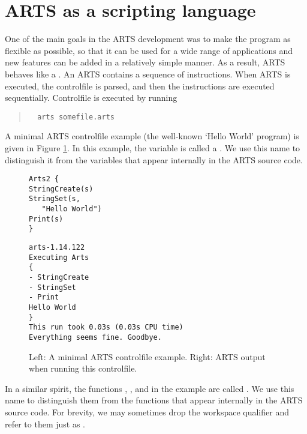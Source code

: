 \section{ARTS as a scripting language}

One of the main goals in the ARTS development was to make the program
as flexible as possible, so that it can be used for a wide range of
applications and new features can be added in a relatively simple
manner. As a result, ARTS behaves like a . An ARTS  contains a sequence of
instructions. When ARTS is executed, the controlfile is parsed, and
then the instructions are executed sequentially. Controlfile
 is executed by running
\begin{quote}
\begin{verbatim}
  arts somefile.arts
\end{verbatim}
\end{quote}

A minimal ARTS controlfile example (the well-known `Hello World' program) is
given in Figure \ref{fig:hello}. In this example, the variable  is
called a \emph{}. We use this name to distinguish it from the
variables that appear internally in the ARTS source code.

\begin{figure}
\footnotesize
\begin{minipage}[t]{0.35\hsize}
\begin{lstlisting}
Arts2 {
StringCreate(s)
StringSet(s,
   "Hello World")
Print(s)
}
\end{lstlisting}
\end{minipage}
\hspace*{\fill}
\begin{minipage}[t]{0.5\hsize}
\begin{lstlisting}
arts-1.14.122
Executing Arts
{
- StringCreate
- StringSet
- Print
Hello World
}
This run took 0.03s (0.03s CPU time)
Everything seems fine. Goodbye.
\end{lstlisting}
\end{minipage}
\caption{Left: A minimal ARTS controlfile example. Right: ARTS output
  when running this controlfile. } 
\label{fig:hello}
\end{figure}

In a similar spirit, the functions ,
, and  in the example are called
\emph{}. We use this name to distinguish
them from the functions that appear internally in the ARTS source
code. For brevity, we may sometimes drop the workspace qualifier and
refer to them just as .

